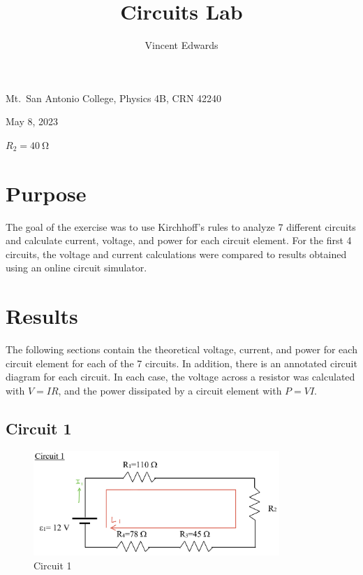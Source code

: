 \documentclass[12pt]{iopart} %
\gdef\units#1{~\mathrm{#1}}
\begin{document}
\title{Circuits Lab}
\author{Vincent Edwards}
\vspace{10pt}
\begin{indented}
  \item[]Mt.~San Antonio College, Physics 4B, CRN 42240
  \item[]May 8, 2023
  \item[]
  \item[]$R_2 = 40 \units{\Omega}$
\end{indented}
\newpage

\section{Purpose}

The goal of the exercise was to use Kirchhoff's rules to analyze 7 different circuits and calculate current, voltage, and power for each circuit element.
For the first 4 circuits, the voltage and current calculations were compared to results obtained using an online circuit simulator.

\section{Results}

The following sections contain the theoretical voltage, current, and power for each circuit element for each of the 7 circuits.
In addition, there is an annotated circuit diagram for each circuit.
In each case, the voltage across a resistor was calculated with $V = IR$, and the power dissipated by a circuit element with $P = VI$.

\subsection{Circuit 1}

\begin{figure}[htbp]
  \begin{indented}
  \item[]\includegraphics[width=0.83\textwidth]{media/circuit-1.png}
  \end{indented}
  \caption{\label{fig:circuit_1}
  Circuit 1
  }
\end{figure}
\end{document}

